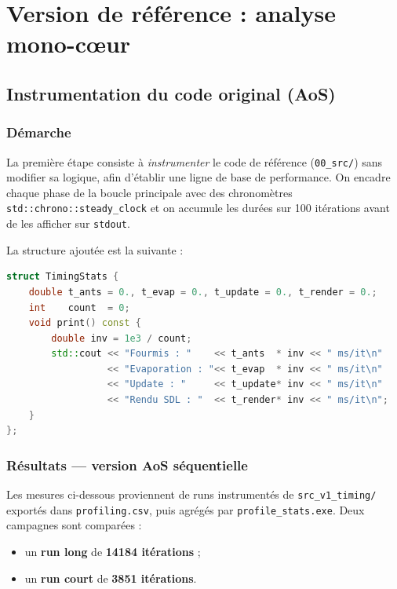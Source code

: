 \chapter{Version de référence : analyse mono-cœur}
\label{chap:baseline}

\section{Instrumentation du code original (AoS)}

\subsection{Démarche}

La première étape consiste à \emph{instrumenter} le code de référence (\texttt{00_src/})
sans modifier sa logique, afin d'établir une ligne de base de performance.
On encadre chaque phase de la boucle principale avec des chronomètres
\texttt{std::chrono::steady\_clock} et on accumule les durées sur 100 itérations
avant de les afficher sur \texttt{stdout}.

La structure ajoutée est la suivante :

\begin{lstlisting}[language=C++, caption={Structure d'accumulation des temps (ant\_simu.cpp)}]
struct TimingStats {
    double t_ants = 0., t_evap = 0., t_update = 0., t_render = 0.;
    int    count  = 0;
    void print() const {
        double inv = 1e3 / count;
        std::cout << "Fourmis : "    << t_ants  * inv << " ms/it\n"
                  << "Evaporation : "<< t_evap  * inv << " ms/it\n"
                  << "Update : "     << t_update* inv << " ms/it\n"
                  << "Rendu SDL : "  << t_render* inv << " ms/it\n";
    }
};
\end{lstlisting}

\subsection{Résultats — version AoS séquentielle}

Les mesures ci-dessous proviennent de runs instrumentés de
\texttt{src\_v1\_timing/} exportés dans \texttt{profiling.csv}, puis agrégés par
\texttt{profile\_stats.exe}. Deux campagnes sont comparées :
\begin{itemize}
    \item un \textbf{run long} de \textbf{14184 itérations} ;
    \item un \textbf{run court} de \textbf{3851 itérations}.
\end{itemize}

